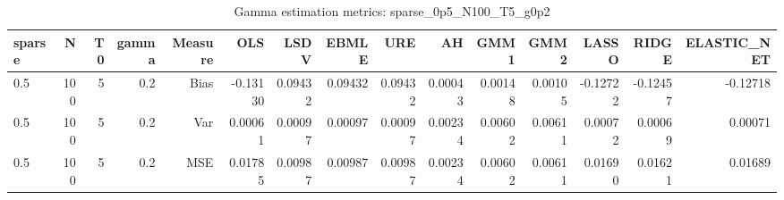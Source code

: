 \begin{table}[!htbp]\centering
\caption{Gamma estimation metrics: sparse_0p5_N100_T5_g0p2}
\label{tab:table1_sparse_0p5_N100_T5_g0p2}
\begin{tabular}{lrrrrrrrrrrrrrr}
\hline
sparse & N & T0 & gamma & Measure & OLS & LSDV & EBMLE & URE & AH & GMM1 & GMM2 & LASSO & RIDGE & ELASTIC_NET \\
\hline
0.5 & 100 & 5 & 0.2 & Bias & -0.13130 & 0.09432 & 0.09432 & 0.09432 & 0.00043 & 0.00148 & 0.00105 & -0.12722 & -0.12457 & -0.12718 \\
0.5 & 100 & 5 & 0.2 & Var & 0.00061 & 0.00097 & 0.00097 & 0.00097 & 0.00234 & 0.00602 & 0.00611 & 0.00072 & 0.00069 & 0.00071 \\
0.5 & 100 & 5 & 0.2 & MSE & 0.01785 & 0.00987 & 0.00987 & 0.00987 & 0.00234 & 0.00602 & 0.00611 & 0.01690 & 0.01621 & 0.01689 \\
\hline
\end{tabular}
\end{table}

